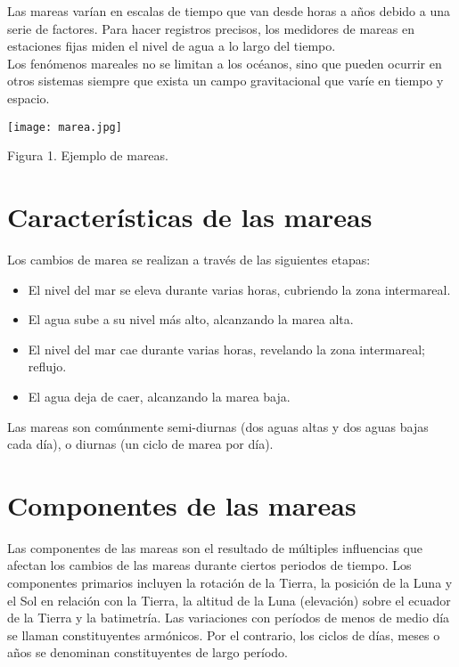 \documentclass[12pt]{article}
\begin{document}
\begin{doublespace}
Las mareas varían en escalas de tiempo que van desde horas a años debido a una serie de factores. Para hacer registros precisos, los medidores de mareas en estaciones fijas miden el nivel de agua a lo largo del tiempo.\\ 

Los fenómenos mareales no se limitan a los océanos, sino que pueden ocurrir en otros sistemas siempre que exista un campo gravitacional que varíe en tiempo y espacio.\\
\begin{center}
\texttt{[image: marea.jpg]}

Figura 1. Ejemplo de mareas. 
\end{center}

\section*{Características de las mareas}
Los cambios de marea se realizan a través de las siguientes etapas:

\begin{itemize}
\item El nivel del mar se eleva durante varias horas, cubriendo la zona intermareal.
\item El agua sube a su nivel más alto, alcanzando la marea alta.
\item El nivel del mar cae durante varias horas, revelando la zona intermareal; reflujo.
\item El agua deja de caer, alcanzando la marea baja. 
\end{itemize}

Las mareas son comúnmente semi-diurnas (dos aguas altas y dos aguas bajas cada día), o diurnas (un ciclo de marea por día).

\section*{Componentes de las mareas}
Las componentes de las mareas son el resultado de múltiples influencias que afectan los cambios de las mareas durante ciertos periodos de tiempo. Los componentes primarios incluyen la rotación de la Tierra, la posición de la Luna y el Sol en relación con la Tierra, la altitud de la Luna (elevación) sobre el ecuador de la Tierra y la batimetría. Las variaciones con períodos de menos de medio día se llaman constituyentes armónicos. Por el contrario, los ciclos de días, meses o años se denominan constituyentes de largo período.


\end{doublespace}
\end{document}
